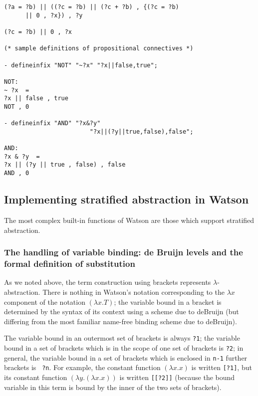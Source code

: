 \documentclass{kluwer}
\begin{document}
\begin{article}
\begin{verbatim}
(?a = ?b) || ((?c = ?b) || (?c + ?b) , {(?c = ?b) 
      || 0 , ?x}) , ?y

(?c = ?b) || 0 , ?x

(* sample definitions of propositional connectives *)

- defineinfix "NOT" "~?x" "?x||false,true";

NOT:  
~ ?x  =  
?x || false , true
NOT , 0

- defineinfix "AND" "?x&?y" 
                        "?x||(?y||true,false),false";

AND:  
?x & ?y  =  
?x || (?y || true , false) , false
AND , 0
\end{verbatim}

\subsection{Implementing stratified abstraction in Watson}

The most complex built-in functions of Watson are those which support
stratified abstraction.

\subsubsection{The handling of variable binding:  de Bruijn levels
and the formal definition of substitution}

As we noted above, the term construction using brackets represents
$\lambda$-abstraction.  There is nothing in Watson's notation
corresponding to the $\lambda x$ component of the notation $(\lambda
x.T)$; the variable bound in a bracket is determined by the syntax of
its context using a scheme due to deBruijn (but differing from the
most familiar name-free binding scheme due to deBruijn).

The variable bound in an outermost set of brackets is always {\tt ?1};
the variable bound in a set of brackets which is in the scope of one
set of brackets is {\tt ?2}; in general, the variable bound in a set
of brackets which is enclosed in {\tt n-1} further brackets is {\tt
?n}.  For example, the constant function $(\lambda x.x)$ is written
{\tt [?1]}, but its constant function $(\lambda y.(\lambda x.x))$ is
written {\tt [[?2]]} (because the bound variable in this term is bound
by the inner of the two sets of brackets).


\end{article}
\end{document}
